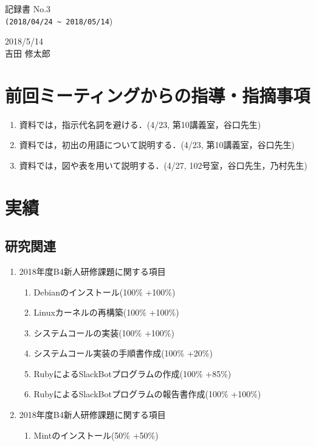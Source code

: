 \documentclass[12pt]{jsarticle}
\begin{document}
\begin{center}
  {\LARGE 記録書 No.3}\\
  {\verb|(2018/04/24 ~ 2018/05/14|)}
\end{center}

\begin{flushright}
  2018/5/14\\
  吉田 修太郎
\end{flushright}
\section{前回ミーティングからの指導・指摘事項}
\label{sec:introduction}
\begin{enumerate}
\item 資料では，指示代名詞を避ける．(4/23, 第10講義室，谷口先生)
\item 資料では，初出の用語について説明する．(4/23, 第10講義室，谷口先生)
\item 資料では，図や表を用いて説明する．(4/27, 102号室，谷口先生，乃村先生)
\end{enumerate}

\section{実績}\label{jisseki}
\subsection{研究関連}\label{kenkyuu}
\begin{enumerate}
\item 2018年度B4新人研修課題に関する項目
  \begin{enumerate}
  \item Debianのインストール(100\% +100\%)
  \item Linuxカーネルの再構築(100\% +100\%)
  \item システムコールの実装(100\% +100\%)
  \item システムコール実装の手順書作成(100\% +20\%)
  \item RubyによるSlackBotプログラムの作成(100\% +85\%)
  \item RubyによるSlackBotプログラムの報告書作成(100\% +100\%)
  \end{enumerate}
\item 2018年度B4新人研修課題に関する項目
  \begin{enumerate}
    \item Mintのインストール(50\% +50\%)
  \end{enumerate}
\end{enumerate}
\end{document}
